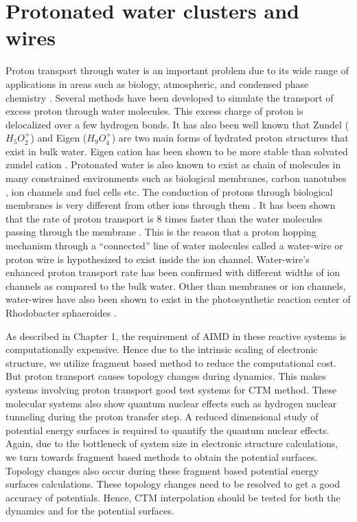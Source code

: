 \section{Protonated water clusters and wires}
{\label{intoToTestSystems}}
Proton transport through water is an important problem due to its wide range of applications in
areas such as biology, atmospheric, and condensed phase chemistry \cite{fragAIMD-elbo}. Several
methods \cite{lobaugh1996quantum, tuckerman1995ab, tuckerman1994ab, schmidt1997molecular,
billeter1998protonizable, vuilleumier1997molecular, vuilleumier1998extended, vuilleumier1998quantum,
vuilleumier1999transport, schmitt1998multistate} have been developed to simulate the transport of
excess proton through water molecules. This excess charge of proton is delocalized over a few hydrogen
bonds. It has also been well known that Zundel ($H_5O_2^+$) and Eigen ($H_9O_4^+$) are two main
forms of hydrated proton structures that exist in bulk water. Eigen cation has been shown to be more
stable than solvated zundel cation \cite{schmitt1999computer}. Protonated water is also known to
exist as chain of molecules in many constrained environments such as biological membranes,
carbon nanotubes \cite{dellago2003proton, mann2003water, cao2010mechanism}, ion channels and fuel
cells etc. The conduction of protons through biological
membranes is very different from other ions through them \cite{Roux}. It has been shown that the
rate of proton transport is 8 times faster than the water molecules passing through the membrane
\cite{pomesRoux1}. This is the reason that a proton hopping mechanism through a ``connected'' line
of water molecules called a water-wire or proton wire \cite{nagle1978molecular} is hypothesized to
exist inside the ion channel. Water-wire's enhanced proton transport rate has been confirmed with
different widths of ion channels as compared to the bulk water. Other than membranes or ion
channels, water-wires have also been shown to exist in the photosynthetic reaction center of
Rhodobacter sphaeroides \cite{baciou1995interruption}.

As described in Chapter 1, the requirement of AIMD in these reactive systems is computationally
expensive. Hence due to the intrinsic scaling of electronic structure, we utilize fragment based
method to reduce the computational cost. But proton transport causes topology changes during dynamics.
This makes systems involving proton transport good test systems for CTM method. These molecular
systems also show quantum nuclear effects such as hydrogen nuclear tunneling
during the proton transfer step. A reduced dimensional study of potential energy surfaces is
required to quantify the quantum nuclear effects. Again, due to the bottleneck of system size
in electronic structure calculations, we turn towards fragment based methods to obtain the potential
surfaces. Topology changes also occur during these fragment based potential energy surfaces
calculations. These topology changes need to be resolved to get a good accuracy of potentials.
Hence, CTM interpolation should be tested for both the dynamics and for the potential
surfaces.

